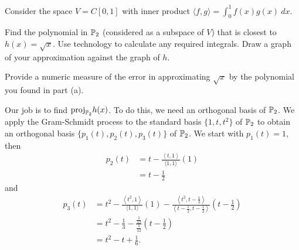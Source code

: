 \begin{example} Consider the space $V = C[0,1]$ with inner product $\langle f,g \rangle = \int_0^1 f(x)g(x) \ dx$. 
\ba
\item Find the polynomial in $\mathbb{P}_2$ (considered as a subspace of $V$) that is closest to $h(x) = \sqrt{x}$. Use technology to calculate any required integrals. Draw a graph of your approximation against the graph of $h$. 

\item Provide a numeric measure of the error in approximating $\sqrt{x}$ by the polynomial you found in part (a). 

\ea

\ExampleSolution

\ba
\item Our job is to find $\text{proj}_{\mathbb{P}_2} h(x)$. To do this, we need an orthogonal basis of $\mathbb{P}_2$. We apply the Gram-Schmidt process to the standard basis $\{1, t, t^2\}$ of $\mathbb{P}_2$ to obtain an orthogonal basis $\{p_1(t), p_2(t), p_3(t)\}$ of $\mathbb{P}_2$. We start with $p_1(t) = 1$, then 
\begin{align*}
p_2(t) &= t - \frac{\left\langle t,1 \right\rangle}{\langle 1,1 \rangle} (1)  \\
	&= t - \frac{1}{2}
\end{align*}
and
 \begin{align*}
p_3(t) &= t^2 - \frac{\left\langle t^2,1 \right\rangle}{\langle 1,1 \rangle} (1) - \frac{\left\langle t^2,t-\frac{1}{2} \right\rangle}{\left\langle t-\frac{1}{2},t-\frac{1}{2} \right\rangle} \left(t-\frac{1}{2}\right) \\
	&= t^2 - \frac{1}{3} - \frac{\frac{1}{12}}{\frac{1}{12}}\left(t-\frac{1}{2}\right) \\
	&= t^2-t + \frac{1}{6}.
\end{align*}


\end{example}

